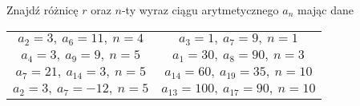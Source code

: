 \documentclass[a4paper,12pt,leqno,fleqn]{article}
\begin{document}
\newpage
Znajdź różnicę $r$ oraz $n$-ty wyraz ciągu arytmetycznego $a_n$ mając dane

\begin{tabularx}{\linewidth}{@{}XX@{}}

  \begin{equation}
    a_2=3,\:a_6=11,\:n=4
  \end{equation}
&
  \begin{equation}
    a_3=1,\:a_7=9,\:n=1
  \end{equation}
\\
  \begin{equation}
    a_4=3,\:a_9=9,\:n=5
  \end{equation}
&
  \begin{equation}
    a_1=30,\:a_8=90,\:n=3
  \end{equation}
\\
  \begin{equation}
    a_7=21,\:a_14=3,\:n=5
  \end{equation}
&
  \begin{equation}
    a_14=60,\:a_19=35,\:n=10
  \end{equation}
\\
  \begin{equation}
    a_2=3,\:a_7=-12,\:n=5
  \end{equation}
&
  \begin{equation}
    a_13=100,\:a_17=90,\:n=10
  \end{equation}

\end{tabularx}
\end{document}
